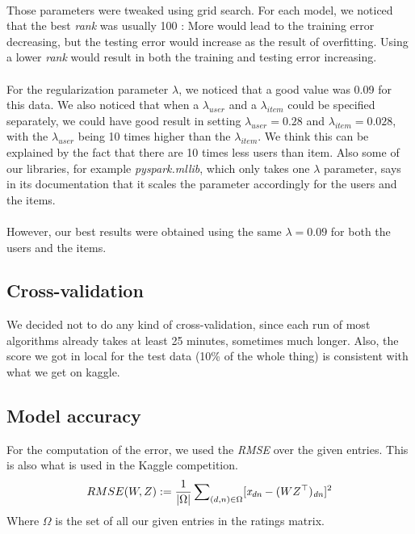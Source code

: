 \documentclass[a4paper]{article}
\begin{document}
\paragraph{}
Those parameters were tweaked using grid search. For each model, we noticed that the best \textit{rank} was usually 100 : 
More would lead to the training error decreasing, but the testing error would increase as the result of overfitting. Using a lower \textit{rank} would result in both the training and testing error increasing.
\paragraph{}
For the regularization parameter \(\lambda\), we noticed that a good value was 0.09 for this data. We also noticed that when a \(\lambda_{user}\) and a \(\lambda_{item}\) could be specified separately, we could have good result in setting \(\lambda_{user} = 0.28\) and \(\lambda_{item} = 0.028\), with the \(\lambda_{user}\) being 10 times higher than the \(\lambda_{item}\). We think this can be explained by the fact that there are 10 times less users than item. Also some of our libraries, for example \textit{pyspark.mllib}, which only takes one \(\lambda\) parameter, says in its documentation that it scales the parameter accordingly for the users and the items. 
\paragraph{}
However, our best results were obtained using the same \(\lambda = 0.09\) for both the users and the items.

\subsection{Cross-validation}
We decided not to do any kind of cross-validation, since each run of most algorithms already takes at least 25 minutes, sometimes much longer.
Also, the score we got in local for the test data (10\% of the whole thing) is consistent with what we get on kaggle.

\subsection{Model accuracy}
For the computation of the error, we used the \textit{RMSE} over the given entries. This is also what is used in the Kaggle competition.  
$$ RMSE(W, Z) := \frac{1}{|\Omega|} \sum\nolimits_{(d, n) \in \Omega} [\textit{x\textsubscript{dn}} - (WZ^\top)\textsubscript{\textit{dn}}]^2 $$
Where \(\Omega\) is the set of all our given entries in the ratings matrix.
\end{document}
